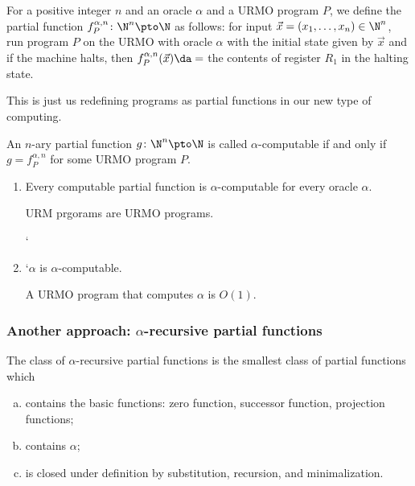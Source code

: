 \documentclass[class=article, crop=false]{standalone}
\begin{document}
\begin{defn}
  For a positive integer $n$ and an oracle $\alpha$ and a URMO program $P$, we define the partial function $f_P^{\alpha,n} \colon \N^n \pto \N$ as follows:  for input $\vec x = (x_1,\ldots,x_n) \in \N^n$, run program $P$ on the URMO with oracle $\alpha$ with the initial state given by $\vec x$ and if the machine halts, then $f_P^{\alpha,n}(\vec x) \da = $ the contents of register $R_1$ in the halting state.
\end{defn}
\begin{rem}
  This is just us redefining programs as partial functions in our new type of computing.
\end{rem}

\begin{defn}
  An $n$-ary partial function $g\colon \N^n \pto \N$ is called $\alpha$-computable if and only if $g=f_P^{\alpha,n}$ for some URMO program $P$.
\end{defn}

\begin{ex}
  \begin{enumerate}[(1)]
    \item Every computable partial function is $\alpha$-computable for every oracle $\alpha$.

      \begin{pf}
        URM prgorams are URMO programs.
      \end{pf}


  ` \item `$\alpha$ is $\alpha$-computable.

      \begin{pf}
        A URMO program that computes $\alpha$ is $O(1)$.
      \end{pf}
  \end{enumerate}
\end{ex}


\subsubsection{Another approach: $\alpha$-recursive partial functions}

\begin{defn}
  The class of $\alpha$-recursive partial functions is the smallest class of partial functions which
    \begin{enumerate}[(a)]
      \item contains the basic functions: zero function, successor function, projection functions;
      \item contains $\alpha$;
      \item is closed under definition by substitution, recursion, and minimalization.
    \end{enumerate}
\end{defn}
\end{document}
